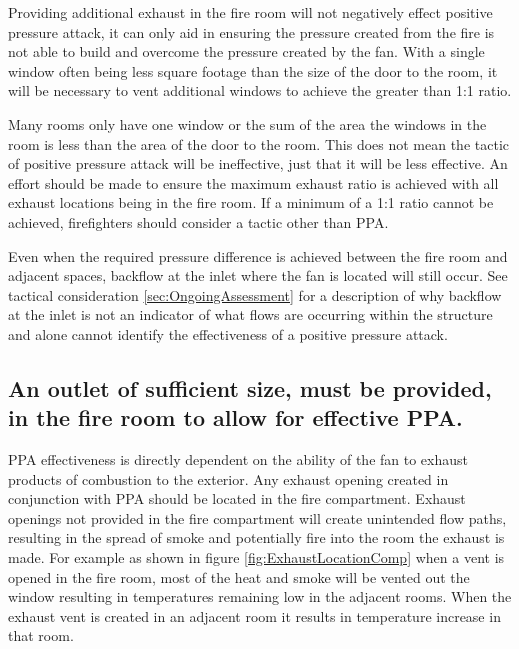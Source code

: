 \documentclass{article}
\begin{document}
Providing additional exhaust in the fire room will not negatively effect positive pressure attack, it can only aid in ensuring the pressure created from the fire is not able to build and overcome the pressure created by the fan. With a single window often being less square footage than the size of the door to the room, it will be necessary to vent additional windows to achieve the greater than 1:1 ratio. 

Many rooms only have one window or the sum of the area the windows in the room is less than the area of the door to the room. This does not mean the tactic of positive pressure attack will be ineffective, just that it will be less effective. An effort should be made to ensure the maximum exhaust ratio is achieved with all exhaust locations being in the fire room. If a minimum of a 1:1 ratio cannot be achieved, firefighters should consider a tactic other than PPA. 

Even when the required pressure difference is achieved between the fire room and adjacent spaces, backflow at the inlet where the fan is located will still occur. See tactical consideration \ref{sec:OngoingAssessment} for a description of why backflow at the inlet is not an indicator of what flows are occurring within the structure and alone cannot identify the effectiveness of a positive pressure attack.

\subsection{An outlet of sufficient size, must be provided, in the fire room to allow for effective PPA.} \label{sec:OutletInFireRoom}
PPA effectiveness is directly dependent on the ability of the fan to exhaust products of combustion to the exterior. Any exhaust opening created in conjunction with PPA should be located in the fire compartment. Exhaust openings not provided in the fire compartment will create unintended flow paths, resulting in the spread of smoke and potentially fire into the room the exhaust is made. For example as shown in figure \ref{fig:ExhaustLocationComp} when a vent is opened in the fire room, most of the heat and smoke will be vented out the window resulting in temperatures remaining low in the adjacent rooms. When the exhaust vent is created in an adjacent room it results in temperature increase in that room.
\end{document}
